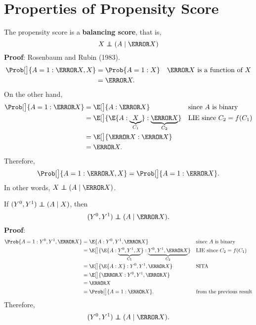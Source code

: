 \section{Properties of Propensity Score}
\begin{Result}{}
    The propensity score is a \textbf{balancing score}, that is,
    \[ X\indep(A\mid \ps{X}) \]
    \tcblower{}
    \textbf{Proof}: Rosenbaum and Rubin (1983).
    \begin{align*}
        \Prob[\big]{A=1\given \ps{X},X}
         & =\Prob{A=1\given X} &  & \text{$\ps{X}$ is a function of $X$} \\
         & =\ps{X}.
    \end{align*}
    On the other hand,
    \begin{align*}
        \Prob[\big]{A=1\given \ps{X}}
         & =\E[\big]{A\given \ps{X}}                                                  &  & \text{since $A$ is binary}    \\
         & =\E[\big]{\E{A\given \underbrace{X}_{C_1}}\given\underbrace{\ps{X}}_{C_2}} &  & \text{LIE since $C_2=f(C_1)$} \\
         & =\E[\big]{\ps{X}\given \ps{X}}                                                                                \\
         & =\ps{X}.
    \end{align*}
    Therefore,
    \[ \Prob[\big]{A=1\given \ps{X},X}=\Prob[\big]{A=1\given \ps{X}}. \]
    In other words, $ X\indep (A\mid \ps{X}) $.
\end{Result}
\begin{Result}{}
    If $ (Y^0,Y^1)\indep (A\mid X) $, then
    \[ (Y^0,Y^1)\indep(A\mid \ps{X}). \]
    \tcblower{}
    \textbf{Proof}:
    \begin{align*}
        \Prob{A=1\given Y^0,Y^1,\ps{X}}
         & =\E{A\given Y^0,Y^1,\ps{X}}                                                                 &  & \text{since $A$ is binary}      \\
         & =\E[\big]{\E{A\given \underbrace{Y^0,Y^1,X}_{C_1}}\given \underbrace{Y^0,Y^1,\ps{X}}_{C_2}} &  & \text{LIE since $C_2=f(C_1)$}   \\
         & =\E[\big]{\E{A\given X}\given Y^0,Y^1,\ps{X}}                                               &  & \text{SITA}                     \\
         & =\E[\big]{\ps{X}\given Y^0,Y^1,\ps{X}}                                                                                           \\
         & =\ps{X}                                                                                                                          \\
         & =\Prob[\big]{A=1\given \ps{X}}.                                                             &  & \text{from the previous result}
    \end{align*}
    Therefore,
    \[ (Y^0,Y^1)\indep(A\mid \ps{X}). \]
\end{Result}